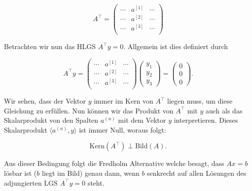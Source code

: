 \begin{equation*}
    A^\top = \begin{pmatrix}
        \cdots & a^{[1]} & \cdots \\
        \cdots & a^{[2]} & \cdots \\
        \cdots & a^{[3]} & \cdots \\
    \end{pmatrix}
\end{equation*}

Betrachten wir nun das HLGS \( A^\top y = 0 \). Allgemein ist dies definiert durch

\begin{equation*}
    A^\top y = \begin{pmatrix}
        \cdots & a^{[1]} & \cdots \\
        \cdots & a^{[2]} & \cdots \\
        \cdots & a^{[3]} & \cdots \\
    \end{pmatrix} \begin{pmatrix}
        y_1 \\ y_2 \\ y_3
    \end{pmatrix} = \begin{pmatrix}
        0 \\ 0 \\ 0
    \end{pmatrix}.
\end{equation*}

Wir sehen, dass der Vektor \( y \) immer im Kern von \( A^\top \) liegen muss, um diese Gleichung zu erfüllen. Nun können wir das Produkt von \( A^\top \) mit \( y \) auch als das Skalarprodukt von den Spalten \( a^{(n)} \) mit dem Vektor \( y \) interpretieren. Dieses Skalarprodukt \( \langle a^{(n)}, y \rangle \) ist immer Null, woraus folgt:

\begin{equation*}
    \text{Kern}(A^\top) \perp \text{Bild}(A).
\end{equation*}

Aus dieser Bedingung folgt die Fredholm Alternative welche besagt, dass \( Ax = b \) lösbar ist (\(b \) liegt im Bild) genau dann, wenn \( b \) senkrecht auf allen Lösungen des adjungierten LGS \( A^\top y = 0 \) steht.
